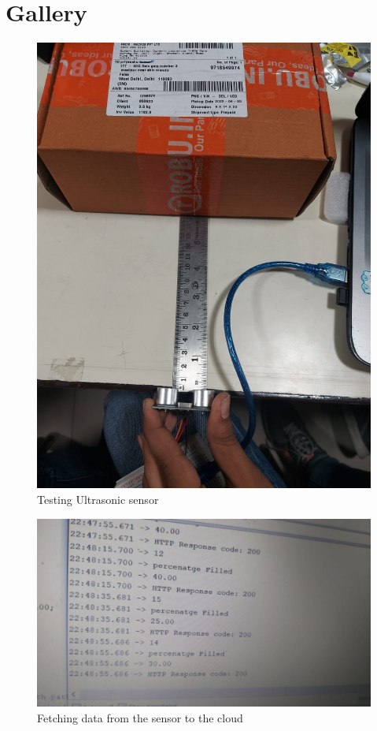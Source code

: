 \documentclass[12pt]{article}
\begin{document}
\section*{Gallery}
\begin{figure}[H]
\centering
    \includegraphics[scale=0.20]{ultra1.jpg}
    \caption{Testing Ultrasonic sensor}
\end{figure}
\begin{figure}[H]
\centering
    \includegraphics[scale=0.20]{check1.jpg}
    \caption{Fetching data from the sensor to the cloud}
\end{figure}
\end{document}
